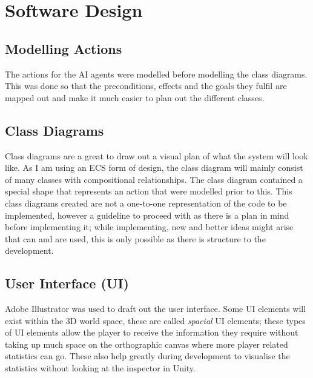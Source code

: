 \documentclass[11pt]{report}
\begin{document}


\section{Software Design}

\subsection{Modelling Actions}
The actions for the AI agents were modelled before modelling the class diagrams. This was done so that the preconditions, effects and the goals they fulfil are mapped out and make it much easier to plan out the different classes.

\subsection{Class Diagrams}
Class diagrams are a great to draw out a visual plan of what the system will look like. As I am using an ECS form of design, the class diagram will mainly consist of many classes with compositional relationships. The class diagram contained a special shape that represents an action that were modelled prior to this. 
This class diagrams created are not a one-to-one representation of the code to be implemented, however a guideline to proceed with as there is a plan in mind before implementing it; while implementing, new and better ideas might arise that can and are used, this is only possible as there is structure to the development.

\subsection{User Interface (UI)}
Adobe Illustrator was used to draft out the user interface. Some UI elements will exist within the 3D world space, these are called \textit{spacial} UI elements; these types of UI elements allow the player to receive the information they require without taking up much space on the orthographic canvas where more player related statistics can go\cite{UIChoices}. These also help greatly during development to visualise the statistics without looking at the inspector in Unity.
\end{document}
